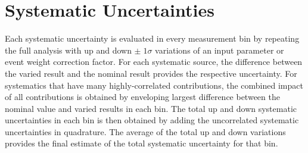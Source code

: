 \section{Systematic Uncertainties}
\label{Systematic_Uncertainties}
Each systematic uncertainty is evaluated in every measurement bin by repeating the full analysis with up and down $\pm \; 1 \sigma$ variations of an input parameter or event weight correction factor.
For each systematic source, the difference between the varied result and the nominal result provides the respective uncertainty.
For systematics that have many highly-correlated contributions, the combined impact of all contributions is obtained by enveloping largest difference between the nominal value and varied results in each bin.
The total up and down systematic uncertainties in each bin is then obtained by adding the uncorrelated systematic uncertainties in quadrature.
The average of the total up and down variations provides the final estimate of the total systematic uncertainty for that bin.

